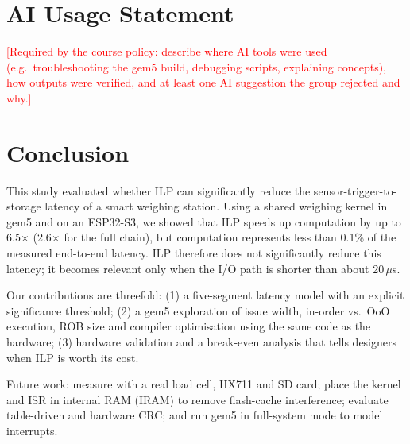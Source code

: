 \documentclass[12pt, a4paper]{article}
\newcommand{\fillin}[1]{\textcolor{red}{#1}}
\begin{document}
\section{AI Usage Statement}
\fillin{[Required by the course policy: describe where AI tools were used (e.g.\ troubleshooting the gem5 build, debugging scripts, explaining concepts), how outputs were verified, and at least one AI suggestion the group rejected and why.]}

\section{Conclusion}
This study evaluated whether ILP can significantly reduce the sensor-trigger-to-storage latency of a smart weighing station. Using a shared weighing kernel in gem5 and on an ESP32-S3, we showed that ILP speeds up computation by up to 6.5$\times$ (2.6$\times$ for the full chain), but computation represents less than 0.1\% of the measured end-to-end latency. ILP therefore does not significantly reduce this latency; it becomes relevant only when the I/O path is shorter than about 20\,$\mu$s.

Our contributions are threefold: (1) a five-segment latency model with an explicit significance threshold; (2) a gem5 exploration of issue width, in-order vs.\ OoO execution, ROB size and compiler optimisation using the same code as the hardware; (3) hardware validation and a break-even analysis that tells designers when ILP is worth its cost.

Future work: measure with a real load cell, HX711 and SD card; place the kernel and ISR in internal RAM (IRAM) to remove flash-cache interference; evaluate table-driven and hardware CRC; and run gem5 in full-system mode to model interrupts.
\end{document}
